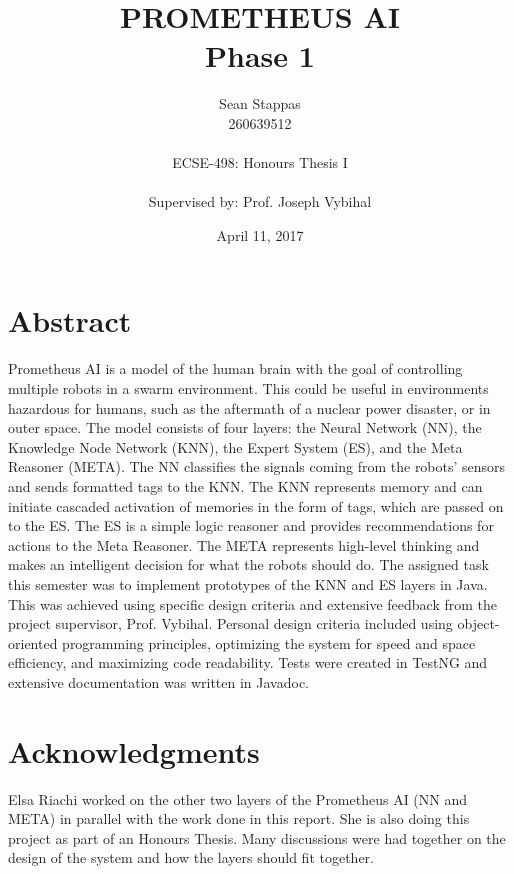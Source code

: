 \documentclass[titlepage,11pt]{article}
\title
{
	\uppercase{Prometheus AI} \\
	\large Phase 1
}
\author %
{
	Sean Stappas \\ 
	260639512 \\
	\\ 
	ECSE-498: Honours Thesis I \\
	\\
	\small Supervised by: Prof. Joseph Vybihal
}
\date{April 11, 2017}
\begin{document}
	
\sloppy

\maketitle

\section*{Abstract}
Prometheus AI is a model of the human brain with the goal of controlling multiple robots in a swarm environment. This could be useful in environments hazardous for humans, such as the aftermath of a nuclear power disaster, or in outer space. The model consists of four layers: the Neural Network (NN), the Knowledge Node Network (KNN), the Expert System (ES), and the Meta Reasoner (META). The NN classifies the signals coming from the robots' sensors and sends formatted tags to the KNN. The KNN represents memory and can initiate cascaded activation of memories in the form of tags, which are passed on to the ES. The ES is a simple logic reasoner and provides recommendations for actions to the Meta Reasoner. The META represents high-level thinking and makes an intelligent decision for what the robots should do. The assigned task this semester was to implement prototypes of the KNN and ES layers in Java. This was achieved using specific design criteria and extensive feedback from the project supervisor, Prof. Vybihal. Personal design criteria included using object-oriented programming principles, optimizing the system for speed and space efficiency, and maximizing code readability. Tests were created in TestNG and extensive documentation was written in Javadoc.

\section*{Acknowledgments}
Elsa Riachi worked on the other two layers of the Prometheus AI (NN and META) in parallel with the work done in this report. She is also doing this project as part of an Honours Thesis. Many discussions were had together on the design of the system and how the layers should fit together.
\end{document}
